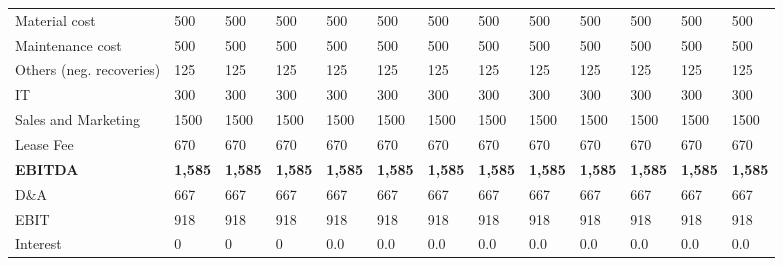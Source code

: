 \begin{tabular}{lllllllllllll}
 Material cost                    & 500            & 500            & 500            & 500            & 500            & 500            & 500            & 500            & 500            & 500            & 500            & 500            \\
 Maintenance cost                 & 500            & 500            & 500            & 500            & 500            & 500            & 500            & 500            & 500            & 500            & 500            & 500            \\
 Others (neg. recoveries)         & 125            & 125            & 125            & 125            & 125            & 125            & 125            & 125            & 125            & 125            & 125            & 125            \\
 IT                               & 300            & 300            & 300            & 300            & 300            & 300            & 300            & 300            & 300            & 300            & 300            & 300            \\
 Sales and Marketing              & 1500           & 1500           & 1500           & 1500           & 1500           & 1500           & 1500           & 1500           & 1500           & 1500           & 1500           & 1500           \\
 Lease Fee                        & 670            & 670            & 670            & 670            & 670            & 670            & 670            & 670            & 670            & 670            & 670            & 670            \\
 \hline \textbf{EBITDA}             & \textbf{1,585}  & \textbf{1,585}  & \textbf{1,585}  & \textbf{1,585}  & \textbf{1,585}  & \textbf{1,585}  & \textbf{1,585}  & \textbf{1,585}  & \textbf{1,585}  & \textbf{1,585}  & \textbf{1,585}  & \textbf{1,585}  \\
 D\&A                              & 667            & 667            & 667            & 667            & 667            & 667            & 667            & 667            & 667            & 667            & 667            & 667            \\
 EBIT                             & 918            & 918            & 918            & 918            & 918            & 918            & 918            & 918            & 918            & 918            & 918            & 918            \\
 Interest                         & 0              & 0              & 0              & 0.0            & 0.0            & 0.0            & 0.0            & 0.0            & 0.0            & 0.0            & 0.0            & 0.0            \\

\end{tabular}
